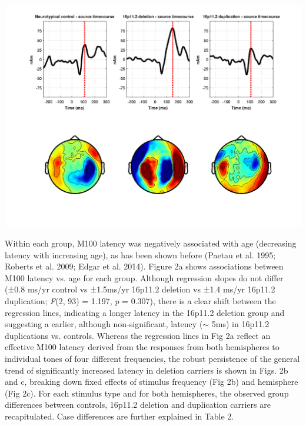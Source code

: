 \documentclass{article}
\begin{document}
\includegraphics[width=\textwidth]{figure-1-updated-final.png}

\bigskip
Within each group, M100 latency was negatively associated with age (decreasing latency with increasing age), as has been shown before (Paetau et al. 1995; Roberts et al. 2009; Edgar et al. 2014). Figure 2a shows associations between M100 latency vs. age for each group. Although regression slopes do not differ (±0.8 ms/yr control vs ±1.5ms/yr 16p11.2 deletion vs ±1.4 ms/yr 16p11.2 duplication; \emph{F}(2, 93) = 1.197, \emph{p} = 0.307), there is a clear shift between the regression lines, indicating a longer latency in the 16p11.2 deletion group and suggesting a earlier, although non-significant, latency ($\sim$ 5ms) in 16p11.2 duplications vs. controls. Whereas the regression lines in Fig 2a reflect an effective M100 latency derived from the responses from both hemispheres to individual tones of four different frequencies, the robust persistence of the general trend of significantly increased latency in deletion carriers is shown in Figs. 2b and c, breaking down fixed effects of stimulus frequency (Fig 2b) and hemisphere (Fig 2c). For each stimulus type and for both hemispheres, the observed group differences between controls, 16p11.2 deletion and duplication carriers are recapitulated.  Case differences are further explained in Table 2. 

\bigskip
\end{document}
